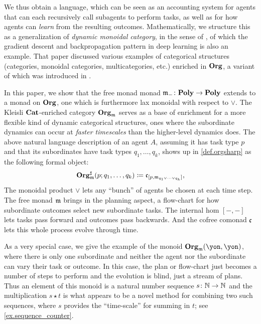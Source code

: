 We thus obtain a language, which can be seen as an accounting system for agents that can each recursively call subagents to perform tasks, as well as for how agents can \emph{learn} from the resulting outcomes. Mathematically, we structure this as a generalization of \emph{dynamic monoidal category}, in the sense of \cite{shapiro2022dynamic}, of which the gradient descent and backpropagation pattern in deep learning is also an example. That paper discussed various examples of categorical structures (categories, monoidal categories, multicategories, etc.) enriched in $\mathbf{Org}$, a variant of which was introduced in \cite[Def 2.19]{spivak2021learnersv1}. 

In this paper, we show that the free monad monad $\mathfrak{m}_-\colon\mathbf{Poly}\to\mathbf{Poly}$ extends to a monad on $\mathbf{Org}$, one which is furthermore lax monoidal with respect to $\vee$. The Kleisli $\mathbf{Cat}$-enriched category $\mathbf{Org}_{\mathfrak{m}}$ serves as a base of enrichment for a more flexible kind of dynamic categorical structures, ones where the subordinate dynamics can occur at \emph{faster timescales} than the higher-level dynamics does. The above natural language description of an agent $A$, assuming it has task type $p$ and that its subordinates have task types $q_1,\ldots,q_k$, shows up in  \cref{def.orgsharp} as the following formal object:
\begin{equation}\label{eqn.homset}
\mathbf{Org}^\sharp_{\mathfrak{m}}(p;q_1,\ldots,q_k)\coloneqq\mathfrak{c}_{[p,\mathfrak{m}_{q_1\vee\cdots\vee q_k}]},
\end{equation}
The monoidal product $\vee$ lets any ``bunch'' of agents be chosen at each time step. The free monad $\mathfrak{m}$ brings in the planning aspect, a flow-chart for how subordinate outcomes select new subordinate tasks. The internal hom $[-,-]$ lets tasks pass forward and outcomes pass backwards. And the cofree comonad $\mathfrak{c}$ lets this whole process evolve through time. 

As a very special case, we give the example of the monoid $\org_\free(\yon,\yon)$, where there is only one subordinate and neither the agent nor the subordinate can vary their task or outcome. In this case, the plan or flow-chart just becomes a number of steps to perform and the evolution is blind, just a stream of plans. Thus an element of this monoid is a natural number sequence $s\colon\mathbb{N}\to\mathbb{N}$ and the multiplication $s\star t$ is what appears to be a novel method for combining two such sequences, where $s$ provides the ``time-scale'' for summing in $t$; see \cref{ex.sequence_counter}.

